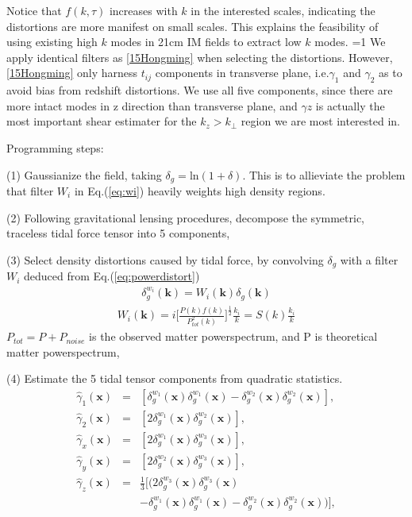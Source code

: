 Notice that $f(k,\tau)$ increases with $k$ in the interested scales, 
indicating the distortions are more manifest on small scales. 
This explains the feasibility of using existing high $k$ modes in 21cm 
IM fields to extract low $k$ modes. 
=1
We apply identical filters as \ref{15Hongming} 
when selecting the distortions. 
However, \ref{15Hongming} only harness $t_{ij}$ components 
in transverse plane, i.e.$\gamma_1$ and $\gamma_2$ 
as to avoid bias from redshift distortions. 
We use all five components, since there are more intact modes in 
z direction than transverse plane, 
and $\gamma z$ is actually the most important 
shear estimater for the $k_z>k_\perp$ region 
we are most interested in.

Programming steps:\noindent

(1) Gaussianize the field, taking 
$\delta_g=\mathrm{ln}(1+\delta)$. 
This is to allieviate the problem that filter $W_i$ in Eq.(\ref{eq:wi}) heavily weights high density regions.

(2) Following gravitational lensing procedures, decompose the symmetric, traceless tidal force tensor into 5 components, 

(3) Select density distortions caused by tidal force, 
by convolving $\delta_g$ with a filter $W_i$ 
deduced from Eq.(\ref{eq:powerdistort}) 
\begin{eqnarray}
\delta^{w_i}_g(\bm{k})=W_i(\bm{k})\delta_g(\bm{k}) 
\end{eqnarray}
\begin{eqnarray}
\label{eq:wi}
W_i(\bm{k})=i \bigg[\frac{P(k)f(k)}{P_{tot}^2(k)}\bigg]^{\frac{1}{2}}\frac{k_i}{k}
=S(k)\frac{k_i}{k}\nonumber
\end{eqnarray}
$P_{tot}=P+P_{noise}$ is the observed matter powerspectrum, 
and P is theoretical matter powerspectrum,

(4) Estimate the 5 tidal tensor components from quadratic statistics.
\begin{eqnarray}
\label{eq:gamma}
\hat{\gamma}_1(\bm{x})&=&
[{\delta}^{w_1}_g(\bm{x}){\delta}^{w_1}_g(\bm{x})-
{\delta}^{w_2}_g(\bm{x}){\delta}^{w_2}_g(\bm{x})],\nonumber\\
\hat{\gamma}_2(\bm{x})&=&
[2{\delta}^{w_1}_g(\bm{x}){\delta}^{w_2}_g(\bm{x})],\nonumber\\
\hat{\gamma}_x(\bm{x})&=&
[2{\delta}^{w_1}_g(\bm{x}){\delta}^{w_3}_g(\bm{x})],\\
\hat{\gamma}_y(\bm{x})&=&
[2{\delta}^{w_2}_g(\bm{x}){\delta}^{w_3}_g(\bm{x})],\nonumber\\
\hat{\gamma}_z(\bm{x})&=&
\frac{1}{3}[(2{\delta}^{w_3}_g(\bm{x}){\delta}^{w_3}_g(\bm{x})\nonumber\\
&&-{\delta}^{w_1}_g(\bm{x}){\delta}^{w_1}_g(\bm{x})
-{\delta}^{w_2}_g(\bm{x}){\delta}^{w_2}_g(\bm{x}))],\nonumber
\end{eqnarray}

